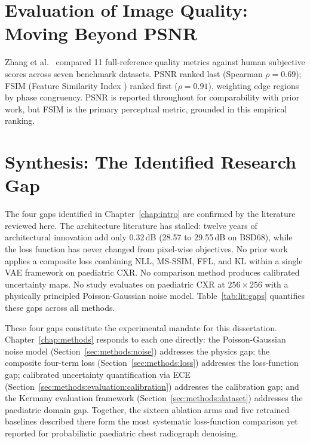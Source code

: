 \documentclass[12pt, a4paper, twoside, openright]{book}
\begin{document}
\section{Evaluation of Image Quality: Moving Beyond PSNR}
\label{sec:lit:iqametrics}

Zhang et al.\ \cite{zhang_comprehensive_2012} compared 11 full-reference quality metrics against human subjective scores across seven benchmark datasets. PSNR ranked last (Spearman $\rho = 0.69$); FSIM (Feature Similarity Index \cite{zhang_fsim_2011}) ranked first ($\rho = 0.91$), weighting edge regions by phase congruency. PSNR is reported throughout for comparability with prior work, but FSIM is the primary perceptual metric, grounded in this empirical ranking.

\section{Synthesis: The Identified Research Gap}
\label{sec:lit:gap}

The four gaps identified in Chapter~\ref{chap:intro} are confirmed by the literature reviewed here. The architecture literature has stalled: twelve years of architectural innovation add only 0.32\,dB (28.57 to 29.55\,dB on BSD68), while the loss function has never changed from pixel-wise objectives. No prior work applies a composite loss combining NLL, MS-SSIM, FFL, and KL within a single VAE framework on paediatric CXR. No comparison method produces calibrated uncertainty maps. No study evaluates on paediatric CXR at $256\times256$ with a physically principled Poisson-Gaussian noise model. Table~\ref{tab:lit:gaps} quantifies these gaps across all methods.

These four gaps constitute the experimental mandate for this dissertation. Chapter~\ref{chap:methods} responds to each one directly: the Poisson-Gaussian noise model (Section~\ref{sec:methods:noise}) addresses the physics gap; the composite four-term loss (Section~\ref{sec:methods:loss}) addresses the loss-function gap; calibrated uncertainty quantification via ECE (Section~\ref{sec:methods:evaluation:calibration}) addresses the calibration gap; and the Kermany evaluation framework (Section~\ref{sec:methods:dataset}) addresses the paediatric domain gap. Together, the sixteen ablation arms and five retrained baselines described there form the most systematic loss-function comparison yet reported for probabilistic paediatric chest radiograph denoising.
\end{document}
